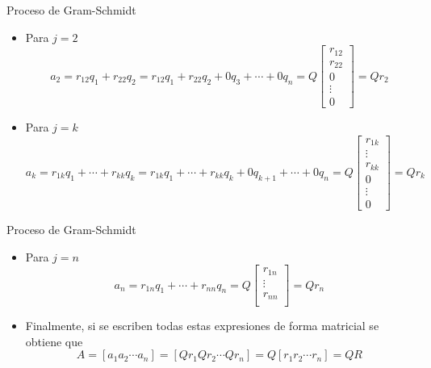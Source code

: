 \documentclass{beamer}
\begin{document}
 \begin{frame}{Proceso de Gram-Schmidt}
 \begin{itemize}
 \item Para $j=2$
 \footnotesize
  $$
  a_2 = r_{12}q_1 + r_{22}q_2 = r_{12}q_1+ r_{22}q_2 + 0q_3 + \cdots + 0q_n = Q\left[\begin{array}{c}
                                                               r_{12}\\
                                                               r_{22}\\
                                                               0\\
                                                               \vdots\\
                                                               0
                                                              \end{array}\right] = Qr_2
  $$
  \normalsize
  \item Para $j=k$
  \scriptsize
  $$
  a_k = r_{1k}q_1 + \cdots + r_{kk}q_k = r_{1k}q_1+ \cdots + r_{kk}q_k + 0q_{k+1} + \cdots + 0q_n = Q\left[\begin{array}{c}
                                                               r_{1k}\\
                                                               \vdots\\
                                                               r_{kk}\\
                                                               0\\
                                                               \vdots\\
                                                               0
                                                              \end{array}\right] = Qr_k
  $$
  \normalsize
 \end{itemize}
 \end{frame}
 \begin{frame}{Proceso de Gram-Schmidt}
  \begin{itemize}
   \item Para $j=n$
   $$
  a_n = r_{1n}q_1 + \cdots + r_{nn}q_n  = Q\left[\begin{array}{c}
                                                               r_{1n}\\
                                                               \vdots\\
                                                               r_{nn}\\                                                              
                                                              \end{array}\right] = Qr_n
  $$
  \item<2-> Finalmente, si se escriben todas estas expresiones de forma matricial se obtiene que
  $$
  A = [a_1 a_2 \cdots a_n] = [Qr_1 Qr_2 \cdots Qr_n] = Q[r_1 r_2 \cdots r_n] = QR
  $$
  \end{itemize}
 \end{frame}
\end{document}
